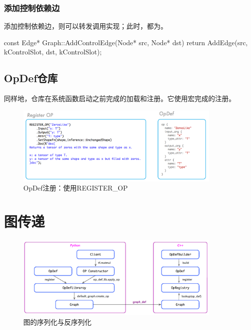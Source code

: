 \begin{content}
\subsubsection{添加控制依赖边}

添加控制依赖边，则可以转发调用实现；此时，都为。

\begin{leftbar}
\begin{c++}
const Edge* Graph::AddControlEdge(Node* src, Node* dst) {
  return AddEdge(src, kControlSlot, dst, kControlSlot);
}
\end{c++}
\end{leftbar}

\subsection{OpDef仓库}

同样地，仓库在系统函数启动之前完成的加载和注册。它使用宏完成的注册。

\begin{figure}[H]
\centering
\includegraphics[width=0.9\textwidth]{figures/cc-op-repo.png}
\caption{OpDef注册：使用REGISTER\_OP}
 \label{fig:cc-op-repo}
\end{figure}

\end{content}

\section{图传递}

\begin{content}

\begin{figure}[H]
\centering
\includegraphics[width=0.9\textwidth]{figures/py-graph-creation.png}
\caption{图的序列化与反序列化}
 \label{fig:py-graph-creation}
\end{figure}

\end{content}

